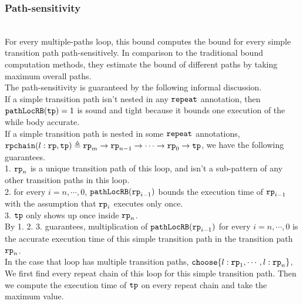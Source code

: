 \subsubsection{Path-sensitivity}
  \\
  For every multiple-paths loop,
  this bound computes the bound for every simple transition path path-sensitively.
  In comparison to the traditional bound computation methods, they
  estimate the bound of different paths by taking maximum overall paths.
  \\
  The path-sensitivity is guaranteed by the following informal discussion.
  \\
  If a simple transition path isn't nested in any $\mathtt{repeat}$ annotation, then
  $\mathtt{pathLocRB}(\mathtt{tp}) = 1$ is sound and tight because it bounds one execution of the while body accurate.
  \\
  If a simple transition path is nested in some $\mathtt{repeat}$ annotations,
  $\mathtt{rpchain}(l: \mathtt{rp}, \mathtt{tp}) \triangleq \mathtt{rp}_m \to \mathtt{rp}_{n-1} \to \cdots \to \mathtt{rp}_{0} \to \mathtt{tp}$, we have the following guarantees.
  \\
  1. $\mathtt{rp}_n$ is a unique transition path of this loop,
  and isn't a sub-pattern of any other transition paths in this loop.
  \\
  2. for every $i = n, \cdots, 0$, $\mathtt{pathLocRB}(\mathtt{rp}_{i - 1})$ bounds the execution time of $\mathtt{rp}_{i - 1}$ with the assumption that $\mathtt{rp}_{i}$ executes only once.
  \\
  3. $\mathtt{tp}$ only shows up once inside $\mathtt{rp}_n$.
  \\
  By 1. 2. 3. guarantees, multiplication of $\mathtt{pathLocRB}(\mathtt{rp}_{i - 1})$ for every $i = n, \cdots, 0$ is the accurate execution time of this
  simple transition path in the transition path $\mathtt{rp}_n$.
  \\
  In the case that loop has multiple transition paths, $\rpchoose{l: \rprog_1, \cdots, l: \rprog_n}$,
  \\
  We first find every repeat chain of this loop for this simple transition path.
  Then we compute the execution time of $\mathtt{tp}$ on every repeat chain and take the maximum value.

